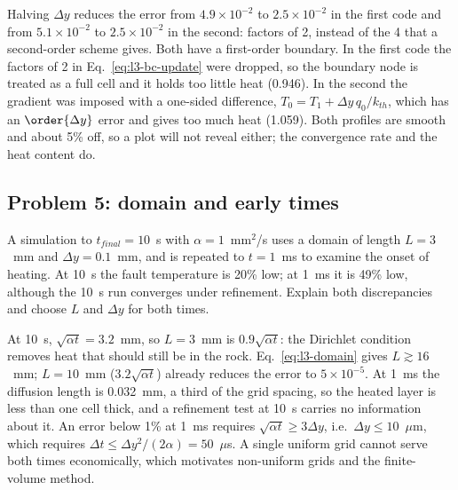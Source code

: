 \solution Halving $\Delta y$ reduces the error from $4.9\times10^{-2}$ to $2.5\times10^{-2}$ in the first code and from $5.1\times10^{-2}$ to $2.5\times10^{-2}$ in the second: factors of 2, instead of the 4 that a second-order scheme gives. Both have a first-order boundary. In the first code the factors of 2 in Eq.~\eqref{eq:l3-bc-update} were dropped, so the boundary node is treated as a full cell and it holds too little heat (0.946). In the second the gradient was imposed with a one-sided difference, $T_0=T_1+\Delta y\,q_0/k_{th}$, which has an $\order{\Delta y}$ error and gives too much heat (1.059). Both profiles are smooth and about 5\% off, so a plot will not reveal either; the convergence rate and the heat content do.

\subsection*{Problem 5: domain and early times}

A simulation to $t_{final}=10$~s with $\alpha=1$~mm$^2$/s uses a domain of length $L=3$~mm and $\Delta y=0.1$~mm, and is repeated to $t=1$~ms to examine the onset of heating. At 10~s the fault temperature is 20\% low; at 1~ms it is 49\% low, although the 10~s run converges under refinement. Explain both discrepancies and choose $L$ and $\Delta y$ for both times.

\solution At 10~s, $\sqrt{\alpha t}=3.2$~mm, so $L=3$~mm is $0.9\sqrt{\alpha t}$: the Dirichlet condition removes heat that should still be in the rock. Eq.~\eqref{eq:l3-domain} gives $L\gtrsim16$~mm; $L=10$~mm ($3.2\sqrt{\alpha t}$) already reduces the error to $5\times10^{-5}$. At 1~ms the diffusion length is 0.032~mm, a third of the grid spacing, so the heated layer is less than one cell thick, and a refinement test at 10~s carries no information about it. An error below 1\% at 1~ms requires $\sqrt{\alpha t}\ge3\Delta y$, i.e.\ $\Delta y\le10$~$\mu$m, which requires $\Delta t\le\Delta y^2/(2\alpha)=50$~$\mu$s. A single uniform grid cannot serve both times economically, which motivates non-uniform grids and the finite-volume method.

